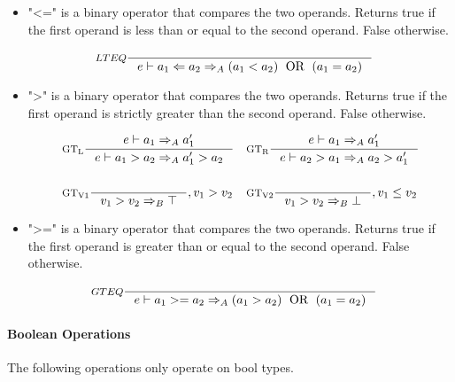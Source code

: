 \begin{itemize}
\item "<=" is a binary operator that compares the two operands. Returns true if the first operand is less than or equal to the second operand. False otherwise.

\begin{align*}
&\inference[$LTEQ$]{}
                    {e \vdash a_1 <= a_2 \Rightarrow_A (a_1 < a_2) \Tor (a_1 = a_2)}
\end{align*}

\item ">" is a binary operator that compares the two operands. Returns true if the first operand is strictly greater than the second operand. False otherwise.

\begin{align*}
&\inference[$\text{GT}_\text{L}$]{e \vdash a_1 \Rightarrow_A a_1'}
                    {e \vdash a_1 > a_2 \Rightarrow_A a_1' > a_2}
&
&\inference[$\text{GT}_\text{R}$]{e \vdash a_1 \Rightarrow_A a_1'}
                    {e \vdash a_2 > a_1 \Rightarrow_A a_2 > a_1'}
\\\\
&\inference[$\text{GT}_\text{V1}$]{}
                    {v_1 > v_2 \Rightarrow_B \top}
                    {, v_1 > v_2}
&
&\inference[$\text{GT}_\text{V2}$]{}
                    {v_1 > v_2 \Rightarrow_B \bot}
                    {, v_1 \leq v_2}
\end{align*}

\item ">=" is a binary operator that compares the two operands. Returns true if the first operand is greater than or equal to the second operand. False otherwise.

\begin{align*}
&\inference[$GTEQ$]{}
                    {e \vdash a_1 >= a_2 \Rightarrow_A (a_1 > a_2) \Tor (a_1 = a_2)}
\end{align*}
\end{itemize}

\paragraph{Boolean Operations}
\label{sec:boolOps}

The following operations only operate on bool types.


